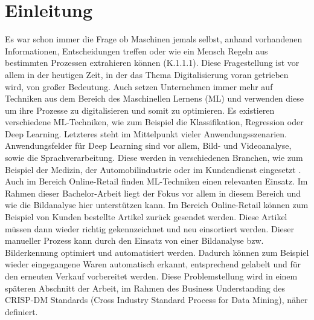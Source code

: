 \documentclass[12pt]{scrreprt}
\begin{document}
	
\begin{titlepage}
	


	
\end{titlepage}	

\newpage
\tableofcontents
\newpage

\listoffigures
{}
\newpage

\listoftables
{}
\newpage

\chapter{Einleitung}
Es war schon immer die Frage ob Maschinen jemals selbst, anhand vorhandenen Informationen, Entscheidungen treffen oder wie ein Mensch Regeln aus bestimmten Prozessen extrahieren können \cite{Chollet2018}(K.1.1.1). Diese Fragestellung ist vor allem in der heutigen Zeit, in der das Thema Digitalisierung voran getrieben wird, von großer Bedeutung. Auch setzen Unternehmen immer mehr auf Techniken aus dem Bereich des Maschinellen Lernens (ML) und verwenden diese um ihre Prozesse zu digitalisieren und somit zu optimieren. Es existieren verschiedene ML-Techniken, wie zum Beispiel die Klassifikation, Regression oder Deep Learning. Letzteres steht im Mittelpunkt vieler Anwendungsszenarien. Anwendungsfelder für Deep Learning sind vor allem, Bild- und Videoanalyse, sowie die Sprachverarbeitung. Diese werden in verschiedenen Branchen, wie zum Beispiel der Medizin, der Automobilindustrie oder im Kundendienst eingesetzt \cite{FraunhoferGesellschaft2018}. Auch im Bereich Online-Retail finden ML-Techniken einen relevanten Einsatz. Im Rahmen dieser Bachelor-Arbeit liegt der Fokus vor allem in diesem Bereich und wie die Bildanalyse hier unterstützen kann. Im Bereich Online-Retail können zum Beispiel von Kunden bestellte Artikel zurück gesendet werden. Diese Artikel müssen dann wieder richtig gekennzeichnet und neu einsortiert werden. Dieser manueller Prozess kann durch den Einsatz von einer Bildanalyse bzw. Bilderkennung optimiert und automatisiert werden. Dadurch können zum Beispiel wieder eingegangene Waren automatisch erkannt, entsprechend gelabelt und für den erneuten Verkauf vorbereitet werden. Diese Problemstellung wird in einem späteren Abschnitt der Arbeit, im Rahmen des Business Understanding des CRISP-DM Standards (Cross Industry Standard Process for Data Mining), näher definiert.\\
\end{document}
